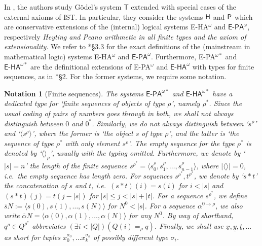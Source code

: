 \documentclass[reqno]{amsart}
\newtheorem{nota}[thm]{Notation}
\def\H{\textup{\textsf{H}}}
\def\P{\textup{\textsf{P}}}
\def\di{\rightarrow}
\numberwithin{equation}{section}
\numberwithin{thm}{section}
\begin{document}
In \cite{brie}, the authors study G\"odel's system $\textsf{T}$ extended with special cases of the external axioms of \textsf{IST}.  
In particular, they consider the systems $\H$ and $\P$ which are conservative extensions of the (internal) logical systems \textsf{E-HA}$^{\omega}$ and $\textsf{E-PA}^{\omega}$, respectively \emph{Heyting and Peano arithmetic in all finite types and the axiom of extensionality}.       
We refer to \cite{kohlenbach3}*{\S3.3} for the exact definitions of the (mainstream in mathematical logic) systems \textsf{E-HA}$^{\omega}$ and $\textsf{E-PA}^{\omega}$.  
Furthermore, \textsf{E-PA}$^{\omega*}$ and $\textsf{E-HA}^{\omega*}$ are the definitional extensions of \textsf{E-PA}$^{\omega}$ and $\textsf{E-HA}^{\omega}$ with types for finite sequences, as in \cite{brie}*{\S2}.  For the former systems, we require some notation.  
\begin{nota}[Finite sequences]\label{skim}\rm
The systems $\textsf{E-PA}^{\omega*}$ and $\textsf{E-HA}^{\omega*}$ have a dedicated type for `finite sequences of objects of type $\rho$', namely $\rho^{*}$.  Since the usual coding of pairs of numbers goes through in both, we shall not always distinguish between $0$ and $0^{*}$.  %
Similarly, we do not always distinguish between `$s^{\rho}$' and `$\langle s^{\rho}\rangle$', where the former is `the object $s$ of type $\rho$', and the latter is `the sequence of type $\rho^{*}$ with only element $s^{\rho}$'.  The empty sequence for the type $\rho^{*}$ is denoted by `$\langle \rangle_{\rho}$', usually with the typing omitted.  Furthermore, we denote by `$|s|=n$' the length of the finite sequence $s^{\rho^{*}}=\langle s_{0}^{\rho},s_{1}^{\rho},\dots,s_{n-1}^{\rho}\rangle$, where $|\langle\rangle|=0$, i.e.\ the empty sequence has length zero.
For sequences $s^{\rho^{*}}, t^{\rho^{*}}$, we denote by `$s*t$' the concatenation of $s$ and $t$, i.e.\ $(s*t)(i)=s(i)$ for $i<|s|$ and $(s*t)(j)=t(j-|s|)$ for $|s|\leq j< |s|+|t|$. For a sequence $s^{\rho^{*}}$, we define $\overline{s}N:=\langle s(0), s(1), \dots,  s(N)\rangle $ for $N^{0}<|s|$.  
For a sequence $\alpha^{0\di \rho}$, we also write $\overline{\alpha}N=\langle \alpha(0), \alpha(1),\dots, \alpha(N)\rangle$ for \emph{any} $N^{0}$.  By way of shorthand, $q^{\rho}\in Q^{\rho^{*}}$ abbreviates $(\exists i<|Q|)(Q(i)=_{\rho}q)$.  Finally, we shall use $\underline{x}, \underline{y},\underline{t}, \dots$ as short for tuples $x_{0}^{\sigma_{0}}, \dots x_{k}^{\sigma_{k}}$ of possibly different type $\sigma_{i}$.          
\end{nota}    
%
%
\end{document}
